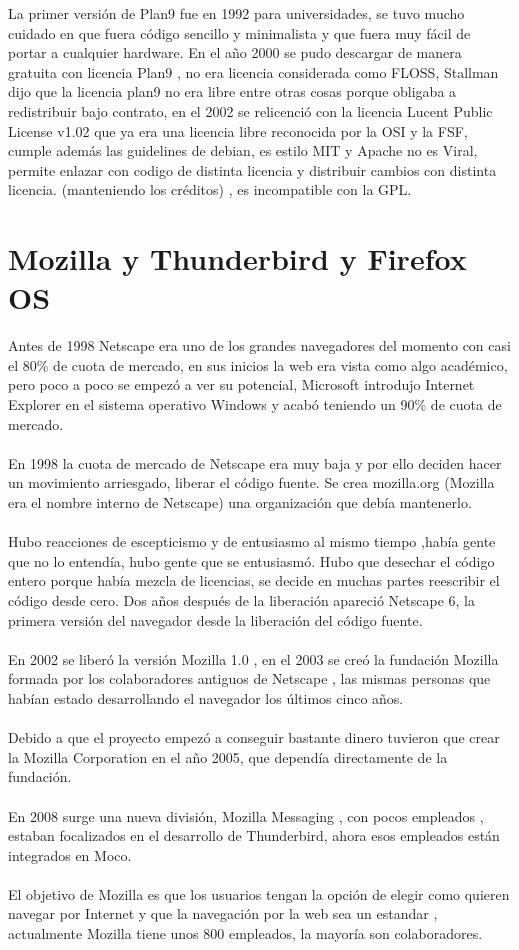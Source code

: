 \documentclass[a4paper,oneside,11pt]{article}
\begin{document}
La primer versi\'on de Plan9 fue en 1992 para universidades, se tuvo mucho cuidado en que fuera c\'odigo sencillo
y minimalista y que fuera muy f\'acil de portar a cualquier hardware.
En el año 2000 se pudo descargar de manera gratuita con licencia Plan9 , no era licencia considerada
como FLOSS, Stallman dijo que la licencia plan9 no era libre entre otras cosas porque obligaba
a redistribuir bajo contrato, en el 2002 se relicenci\'o con la licencia Lucent Public License v1.02 que ya era 
una licencia libre reconocida por la OSI y la FSF, cumple adem\'as las guidelines de debian,
 es estilo MIT y Apache no es Viral, permite enlazar con codigo de
 distinta licencia y distribuir cambios con distinta licencia. (manteniendo los cr\'editos) ,
  es incompatible con la GPL.

\section{Mozilla y Thunderbird y Firefox OS}

Antes de 1998 Netscape era uno de los grandes navegadores del momento con casi el 80\% de cuota de mercado, en sus inicios la web
era vista como algo acad\'emico, pero poco a poco se empez\'o a ver su potencial, Microsoft introdujo Internet Explorer en el 
sistema operativo Windows y acab\'o teniendo un 90\% de cuota de mercado.
\\\\
En 1998 la cuota de mercado de Netscape era muy baja y por ello deciden hacer un movimiento arriesgado, liberar el
c\'odigo fuente. Se crea mozilla.org (Mozilla era el nombre interno de Netscape) una organizaci\'on que deb\'ia mantenerlo.
 \\\\
Hubo reacciones de escepticismo y de entusiasmo al mismo tiempo ,hab\'ia gente que no lo entend\'ia, hubo gente que se entusiasm\'o. 
Hubo que desechar el c\'odigo entero porque hab\'ia mezcla de licencias, se decide en muchas partes reescribir el c\'odigo desde cero.
Dos años despu\'es de la liberaci\'on apareci\'o Netscape 6, la primera versi\'on del navegador desde la liberaci\'on del c\'odigo fuente.
\\\\
En 2002 se liber\'o la versi\'on Mozilla 1.0 , en el 2003 se cre\'o la fundaci\'on Mozilla formada por los colaboradores
antiguos de Netscape , las mismas personas que hab\'ian estado desarrollando el navegador los \'ultimos cinco años.
\\\\
Debido a que el proyecto empez\'o a conseguir bastante dinero tuvieron que crear la Mozilla Corporation en el año 2005, que 
depend\'ia directamente de la fundaci\'on.
\\\\
En 2008 surge una nueva divisi\'on, Mozilla Messaging , con pocos empleados , estaban focalizados en el desarrollo de Thunderbird, 
ahora esos empleados est\'an integrados en Moco.
\\\\
El objetivo de Mozilla es que los usuarios tengan la opci\'on de elegir como quieren navegar por Internet y que la 
navegaci\'on por la web sea un estandar , actualmente Mozilla tiene unos 800 empleados, la mayor\'ia 
son colaboradores. 
\end{document}
